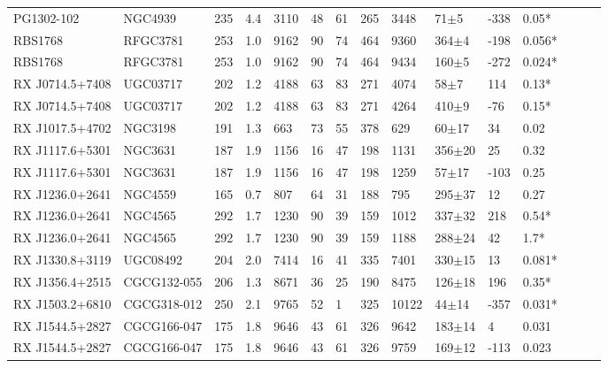 \documentclass[twocolumn,tighten]{aastex6}
\begin{document}
\begin{table}[ht]
\begin{center}
\begin{tabular}{l l l l l l l l l l l l l l l}
PG1302-102  				&  NGC4939  					&  235  & 4.4 &  3110  	&  48  &  61  	&  265  &  3448  	&  71$\pm$5  		&  -338  	&  0.05*  \\
RBS1768  				&  RFGC3781  					&  253  & 1.0 &  9162  	&  90  &  74  	&  464  &  9360  	&  364$\pm$4  		&  -198  	&  0.056*  \\
RBS1768  				&  RFGC3781  					&  253  & 1.0 &  9162  	&  90  &  74  	&  464  &  9434  	&  160$\pm$5  		&  -272  	&  0.024*  \\
RX J0714.5+7408  			&  UGC03717  					&  202  & 1.2 &  4188  	&  63  &  83  	&  271  &  4074  	&  58$\pm$7  		&  114  	&  0.13*  \\
RX J0714.5+7408  			&  UGC03717  					&  202  & 1.2 &  4188  	&  63  &  83  	&  271  &  4264  	&  410$\pm$9  		&  -76  	&  0.15*  \\
RX J1017.5+4702  			&  NGC3198  					&  191  & 1.3 &  663  	&  73  &  55  	&  378  &  629  		&  60$\pm$17  		&  34  	&  0.02  \\
RX J1117.6+5301  			&  NGC3631 					&  187  & 1.9 &  1156  	&  16  &  47  	&  198  &  1131  	&  356$\pm$20  	&  25  	&  0.32  \\
RX J1117.6+5301  			&  NGC3631 	 				&  187  & 1.9 &  1156  	&  16  &  47  	&  198  &  1259  	&  57$\pm$17  		&  -103  	&  0.25  \\
RX J1236.0+2641  			&  NGC4559  					&  165  & 0.7 &  807  	&  64  &  31  	&  188  &  795  		&  295$\pm$37  	&  12  	&  0.27  \\
RX J1236.0+2641  			&  NGC4565  					&  292  & 1.7 &  1230  	&  90  &  39  	&  159  &  1012  	&  337$\pm$32  	&  218  	&  0.54*  \\
RX J1236.0+2641  			&  NGC4565  					&  292  & 1.7 &  1230  	&  90  &  39  	&  159  &  1188  	&  288$\pm$24  	&  42  	&  1.7*  \\
RX J1330.8+3119  			&  UGC08492  					&  204  & 2.0 &  7414  	&  16  &  41  	&  335  &  7401  	&  330$\pm$15  	&  13  	&  0.081*  \\
RX J1356.4+2515  			&  CGCG132-055  				&  206  & 1.3 &  8671  	&  36  &  25  	&  190  &  8475  	&  126$\pm$18  	&  196  	&  0.35*  \\
RX J1503.2+6810  			&  CGCG318-012  				&  250  & 2.1 &  9765  	&  52  &  1  	&  325  &  10122  	&  44$\pm$14  		&  -357  	&  0.031*  \\
RX J1544.5+2827  			&  CGCG166-047  				&  175  & 1.8 &  9646  	&  43  &  61  	&  326  &  9642  	&  183$\pm$14  	&  4  		&  0.031  \\
RX J1544.5+2827  			&  CGCG166-047  				&  175  & 1.8 &  9646  	&  43  &  61  	&  326  &  9759  	&  169$\pm$12  	&  -113  	&  0.023  \\

\end{tabular}
\end{center}
\end{table}
\end{document}
